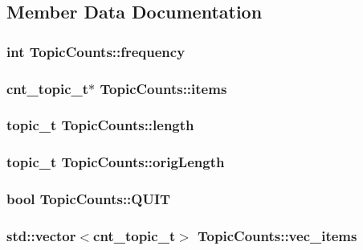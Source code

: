 \subsection{Member Data Documentation}
\hypertarget{struct_topic_counts_a13c5a4d017260fe85c564319f0a4fe90}{
\subsubsection[{frequency}]{\setlength{\rightskip}{0pt plus 5cm}int {\bf TopicCounts::frequency}}}
\label{struct_topic_counts_a13c5a4d017260fe85c564319f0a4fe90}
\hypertarget{struct_topic_counts_a50185bb9cf12838252564d28c00e59a7}{
\subsubsection[{items}]{\setlength{\rightskip}{0pt plus 5cm}cnt\_\-topic\_\-t$\ast$ {\bf TopicCounts::items}}}
\label{struct_topic_counts_a50185bb9cf12838252564d28c00e59a7}
\hypertarget{struct_topic_counts_abbecea34e46a52c0bfec37872960e18d}{
\subsubsection[{length}]{\setlength{\rightskip}{0pt plus 5cm}topic\_\-t {\bf TopicCounts::length}}}
\label{struct_topic_counts_abbecea34e46a52c0bfec37872960e18d}
\hypertarget{struct_topic_counts_af564d3c9b1e333865e07e0e9bcad497f}{
\subsubsection[{origLength}]{\setlength{\rightskip}{0pt plus 5cm}topic\_\-t {\bf TopicCounts::origLength}}}
\label{struct_topic_counts_af564d3c9b1e333865e07e0e9bcad497f}
\hypertarget{struct_topic_counts_a4bd537cce5cd7adadc45e3355bf5a943}{
\subsubsection[{QUIT}]{\setlength{\rightskip}{0pt plus 5cm}bool {\bf TopicCounts::QUIT}}}
\label{struct_topic_counts_a4bd537cce5cd7adadc45e3355bf5a943}
\hypertarget{struct_topic_counts_a8f8362bcc278b7a7bdccec005f21c4a0}{
\subsubsection[{vec\_\-items}]{\setlength{\rightskip}{0pt plus 5cm}std::vector$<$cnt\_\-topic\_\-t$>$ {\bf TopicCounts::vec\_\-items}}}
\label{struct_topic_counts_a8f8362bcc278b7a7bdccec005f21c4a0}


